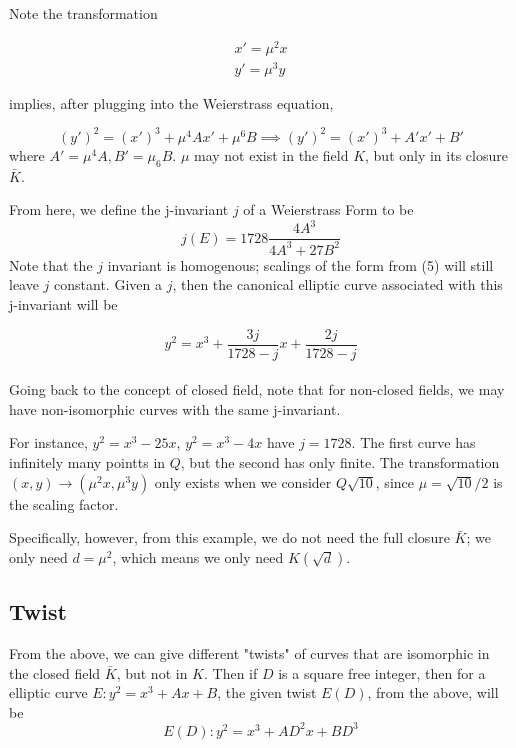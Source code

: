 \documentclass[12pt,twoside]{article}
\begin{document}
Note the transformation  

\begin{align*}
x' = \mu^{2}x \\   
y' = \mu^{3}y 
\end{align*}

implies, after plugging into the Weierstrass equation,

\begin{equation} 
(y')^{2} = (x')^{3} + \mu^{4}Ax' +\mu^{6}B \implies (y')^{2} = (x')^{3} + A'x' + B'  
\end{equation} 
where $A' = \mu^{4}A, B' = \mu_{6}B$. $\mu$ may not exist in the field $K$, but only in its closure $\bar{K}$. 

From here, we define the j-invariant $j$ of a Weierstrass Form to be 
\begin{equation} 
j(E) = 1728 \frac{4A^{3}}{4A^{3} + 27B^{2}}
\end{equation}
Note that the $j$ invariant is homogenous; scalings of the form from (5) will still leave $j$ constant. Given a $j$, then the canonical elliptic curve associated with this j-invariant will be 

\begin{equation} 
y^{2}  = x^{3} + \frac{3j}{1728 - j}x + \frac{2j}{1728 - j} 
\end{equation}
\\
Going back to the concept of closed field, note that for non-closed fields, we may have non-isomorphic curves with the same j-invariant. 

For instance, $y^{2} = x^{3} - 25x$, $y^{2} = x^{3} - 4x$ have $j=1728$. The first curve has infinitely many pointts in $Q$, but the second has only finite. The transformation $(x,y) \rightarrow (\mu^{2}x, \mu^{3}y)$ only exists when we consider $Q\sqrt{10}$, since $\mu = \sqrt{10}/2$ is the scaling factor. 

Specifically, however, from this example, we do not need the full closure $\bar{K}$; we only need $d = \mu^{2}$, which means we only need $K(\sqrt{d})$.

\subsection{Twist} 
From the above, we can give different "twists" of curves that are isomorphic in the closed field $\bar{K}$, but not in $K$. Then if $D$ is a square free integer, then for a elliptic curve $E: y^{2} = x^{3} + Ax + B$, the given twist $E(D)$, from the above, will be 
\begin{equation} 
E(D): y^{2} = x^{3} + AD^{2}x + BD^{3} 
\end{equation}
\end{document}
